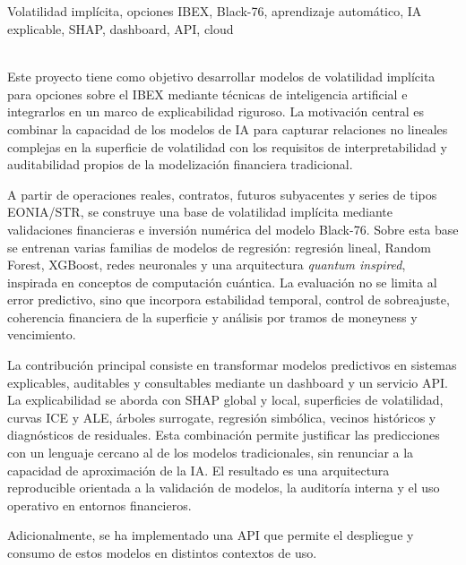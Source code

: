 \begin{center}
  {\large\bfseries \ProjectTitle}\\
\end{center}

\begin{center}
  \AuthorOne\\
  \AuthorTwo\\
  \vspace{0.7cm}
  \\
  Volatilidad implícita, opciones IBEX, Black-76, aprendizaje automático,
  IA explicable, SHAP, dashboard, API, cloud\\
  \vspace{0.7cm}
  \\
\end{center}

Este proyecto tiene como objetivo desarrollar modelos de volatilidad implícita para opciones sobre el IBEX mediante técnicas de inteligencia artificial e integrarlos en un marco de explicabilidad riguroso. La motivación central es combinar la capacidad de los modelos de IA para capturar relaciones no lineales complejas en la superficie de volatilidad con los requisitos de interpretabilidad y auditabilidad propios de la modelización financiera tradicional.

A partir de operaciones reales, contratos, futuros subyacentes y series de tipos EONIA/\texteuro{}STR, se construye una base de volatilidad implícita mediante validaciones financieras e inversión numérica del modelo Black-76. Sobre esta base se entrenan varias familias de modelos de regresión: regresión lineal, Random Forest, XGBoost, redes neuronales y una arquitectura \emph{quantum inspired}, inspirada en conceptos de computación cuántica. La evaluación no se limita al error predictivo, sino que incorpora estabilidad temporal, control de sobreajuste, coherencia financiera de la superficie y análisis por tramos de moneyness y vencimiento.

La contribución principal consiste en transformar modelos predictivos en sistemas explicables, auditables y consultables mediante un dashboard y un servicio API. La explicabilidad se aborda con SHAP global y local, superficies de volatilidad, curvas ICE y ALE, árboles surrogate, regresión simbólica, vecinos históricos y diagnósticos de residuales. Esta combinación permite justificar las predicciones con un lenguaje cercano al de los modelos tradicionales, sin renunciar a la capacidad de aproximación de la IA. El resultado es una arquitectura reproducible orientada a la validación de modelos, la auditoría interna y el uso operativo en entornos financieros.

Adicionalmente, se ha implementado una API que permite el despliegue y consumo de estos modelos en distintos contextos de uso.

\newpage
